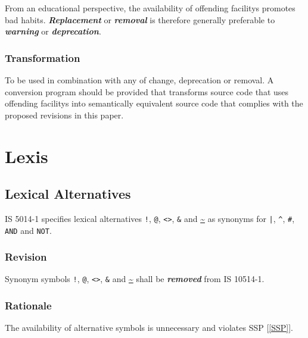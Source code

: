 \documentclass[10pt,a4paper,leqno,fleqn]{article}
\renewcommand{\emph}[1]{\textbf{\textit{#1}}}
\begin{document}
\par\noindent From an educational perspective, the availability of
\glspl{offending facility} promotes bad habits. \emph{Replacement} or
\emph{removal} is therefore generally preferable to \emph{warning} or
\emph{deprecation}.

\subsubsection{Transformation}

To be used in combination with any of change, deprecation or removal.
A conversion program should be provided that transforms source code that uses
\glspl{offending facility} into semantically equivalent source code that
complies with the proposed revisions in this paper.



\section{Lexis}

\subsection{Lexical Alternatives}

IS 5014-1 specifies lexical alternatives \verb|!|, \verb|@|, \verb|<>|, \verb|&| and
\url{~} as synonyms for \verb!|!, \verb|^|, \verb|#|, \verb|AND| and \verb|NOT|.

\subsubsection{Revision}

Synonym symbols \verb|!|, \verb|@|, \verb|<>|, \verb|&| and \url{~} shall be
\emph{removed} from IS 10514-1.

\subsubsection{Rationale}

The availability of alternative symbols is unnecessary and violates SSP [\ref{SSP}].
\end{document}
